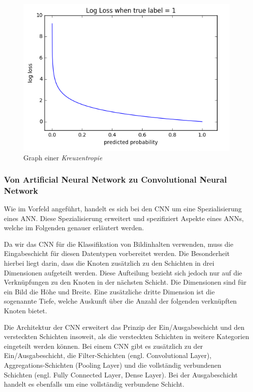 \begin{figure}[H]
	\centering
	\includegraphics[width=\imgMed]{images/theory/cross_entropy.png}
	\caption{Graph einer \textit{Kreuzentropie} \cite{fortuna_viana_2019}} 
	\label{fig:crossentropy}
\end{figure}

\subsubsection*{Von Artificial Neural Network zu Convolutional Neural Network}
Wie im Vorfeld angeführt, handelt es sich bei den CNN um eine Spezialisierung eines ANN. Diese Spezialisierung erweitert und spezifiziert Aspekte eines ANNs, welche im Folgenden genauer erläutert werden.

Da wir das CNN für die Klassifikation von Bildinhalten verwenden, muss die Eingabeschicht für diesen Datentypen vorbereitet werden. Die Besonderheit hierbei liegt darin, dass die Knoten zusätzlich zu den Schichten in drei Dimensionen aufgeteilt werden. Diese Aufteilung bezieht sich jedoch nur auf die Verknüpfungen zu den Knoten in der nächsten Schicht. Die Dimensionen sind für ein Bild die Höhe und Breite. Eine zusätzliche dritte Dimension ist die sogenannte Tiefe, welche Auskunft über die Anzahl der folgenden verknüpften Knoten bietet.

Die Architektur der CNN erweitert das Prinzip der Ein/Ausgabeschicht und den versteckten Schichten insoweit, als  die versteckten Schichten in weitere Kategorien eingeteilt werden können. Bei einem CNN gibt es zusätzlich zu der Ein/Ausgabeschicht, die Filter-Schichten (engl. Convolutional Layer), Aggregations-Schichten (Pooling Layer) und die vollständig verbundenen Schichten (engl. Fully Connected Layer, Dense Layer).
Bei der Ausgabeschicht handelt es ebenfalls um eine vollständig verbundene Schicht. \cite*{Keiron2015}

